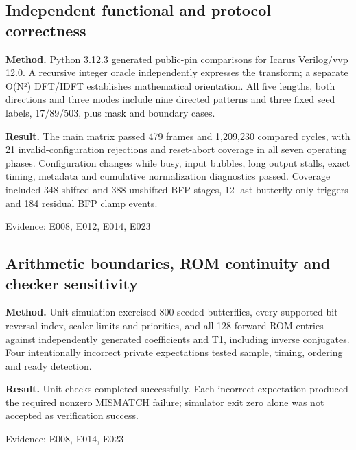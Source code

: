 \documentclass[11pt,a4paper]{article}
\begin{document}
\subsection{Independent functional and protocol correctness}

\textbf{Method.} Python 3.12.3 generated public-pin comparisons for Icarus Verilog/\allowbreak{}vvp 12.0. A recursive integer oracle independently expresses the transform; a separate O(\allowbreak{}N²)\allowbreak{} DFT/\allowbreak{}IDFT establishes mathematical orientation. All five lengths,\allowbreak{} both directions and three modes include nine directed patterns and three fixed seed labels,\allowbreak{} 17/\allowbreak{}89/\allowbreak{}503,\allowbreak{} plus mask and boundary cases.

\textbf{Result.} The main matrix passed 479 frames and 1,\allowbreak{}209,\allowbreak{}230 compared cycles,\allowbreak{} with 21 invalid-configuration rejections and reset-abort coverage in all seven operating phases. Configuration changes while busy,\allowbreak{} input bubbles,\allowbreak{} long output stalls,\allowbreak{} exact timing,\allowbreak{} metadata and cumulative normalization diagnostics passed. Coverage included 348 shifted and 388 unshifted BFP stages,\allowbreak{} 12 last-butterfly-only triggers and 184 residual BFP clamp events.

{\small Evidence: E008,\allowbreak{} E012,\allowbreak{} E014,\allowbreak{} E023}

\subsection{Arithmetic boundaries,\allowbreak{} ROM continuity and checker sensitivity}

\textbf{Method.} Unit simulation exercised 800 seeded butterflies,\allowbreak{} every supported bit-reversal index,\allowbreak{} scaler limits and priorities,\allowbreak{} and all 128 forward ROM entries against independently generated coefficients and T1,\allowbreak{} including inverse conjugates. Four intentionally incorrect private expectations tested sample,\allowbreak{} timing,\allowbreak{} ordering and ready detection.

\textbf{Result.} Unit checks completed successfully. Each incorrect expectation produced the required nonzero MISMATCH failure; simulator exit zero alone was not accepted as verification success.

{\small Evidence: E008,\allowbreak{} E014,\allowbreak{} E023}
\end{document}
